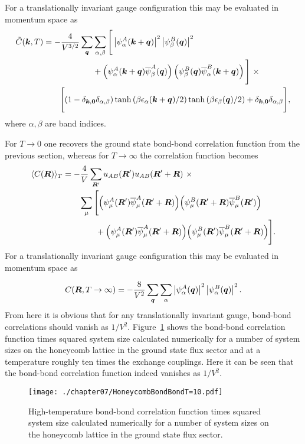 %
For a translationally invariant gauge configuration this may be evaluated in momentum space as
%
\begin{align}
	\tilde{C}(\bm{k}, T) &= -\frac{4}{V^{3/2}} \sum_{\bm{q}} \sum_{\alpha,\beta} \Bigg[ \left|\psi_{\alpha}^A(\bm{k} + \bm{q})\right|^2 \left|\psi_{\beta}^B(\bm{q})\right|^2 \nonumber\\
	&\qquad\qquad\qquad+ \left(\psi_{\alpha}^A(\bm{k} + \bm{q}) \overline{\psi}_{\beta}^A(\bm{q})\right) \left(\psi_{\beta}^B(\bm{q}) \overline{\psi}_{\alpha}^B(\bm{k} + \bm{q})\right) \Bigg]~\times \nonumber\\
								&\qquad\Bigg[ (1 - \delta_{\bm{k},\bm{0}}\delta_{\alpha,\beta}) \tanh{\left(\beta \epsilon_\alpha(\bm{k}+\bm{q})/2\right)} \tanh{\left(\beta \epsilon_\beta(\bm{q})/2\right)} + \delta_{\bm{k},\bm{0}}\delta_{\alpha,\beta} \Bigg],
\end{align}
%
where $\alpha,\beta$ are band indices.

For $T\rightarrow 0$ one recovers the ground state bond-bond correlation function from the previous section, whereas for $T\rightarrow \infty$ the correlation function becomes
%
\begin{align}
	\langle C(\bm{R}) \rangle_T	&= -\frac{4}{V} \sum_{\bm{R}'} u_{AB}(\bm{R}') u_{AB}(\bm{R}' + \bm{R})~\times \nonumber\\
					&\qquad\sum_{\mu} \Bigg[\Big(\psi_{\mu}^A(\bm{R}') \overline{\psi}_{\mu}^A(\bm{R}' + \bm{R})\Big) \Big(\psi_{\mu}^B(\bm{R}' + \bm{R}) \overline{\psi}_{\mu}^B(\bm{R}') \Big) \nonumber\\
					&\qquad\qquad+ \Big(\psi_{\mu}^A(\bm{R}') \overline{\psi}_{\mu}^A(\bm{R}' + \bm{R})\Big) \Big(\psi_{\mu}^B(\bm{R}') \overline{\psi}_{\mu}^B(\bm{R}' + \bm{R}) \Big)\Bigg].
\end{align}
%
For a translationally invariant gauge configuration this may be evaluated in momentum space as

%
\begin{equation}
	C(\bm{R}, T\rightarrow\infty) = -\frac{8}{V^2} \sum_{\bm{q}} \sum_{\alpha} \left|\psi_{\alpha}^A(\bm{q}) \right|^2 \left|\psi_{\alpha}^B(\bm{q}) \right|^2.
\end{equation}
%
From here it is obvious that for any translationally invariant gauge, bond-bond correlations should vanish as $1/V^2$.
Figure~\ref{fig:chapter07_6_3BondBondHighTemp} shows the bond-bond correlation function times squared system size calculated numerically for a number of system sizes on the honeycomb lattice in the ground state flux sector and at a temperature roughly ten times the exchange couplings.
Here it can be seen that the bond-bond correlation function indeed vanishes as $1/V^2$.
%
\begin{figure}[tb]
	\centering
	\texttt{[image: ./chapter07/HoneycombBondBondT=10.pdf]}
	\caption{
		High-temperature bond-bond correlation function times squared system size calculated numerically for a number of system sizes on the honeycomb lattice in the ground state flux sector.
	}
	\label{fig:chapter07_6_3BondBondHighTemp}
\end{figure}
%

